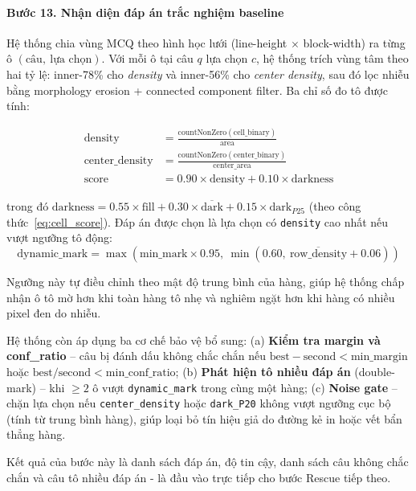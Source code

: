 \paragraph{Bước 13. Nhận diện đáp án trắc nghiệm baseline}
\label{sec:pipeline-buoc-13}

Hệ thống chia vùng MCQ theo hình học lưới (line-height $\times$ block-width) ra từng ô $(\text{câu},\ \text{lựa chọn})$. Với mỗi ô tại câu $q$ lựa chọn $c$, hệ thống trích vùng tâm theo hai tỷ lệ: inner-78\% cho \textit{density} và inner-56\% cho \textit{center density}, sau đó lọc nhiễu bằng morphology erosion + connected component filter. Ba chỉ số đo tô được tính:

\begin{align}
\text{density} &= \frac{\text{countNonZero}(\text{cell\_binary})}{\text{area}} \\[4pt]
\text{center\_density} &= \frac{\text{countNonZero}(\text{center\_binary})}{\text{center\_area}} \\[4pt]
\text{score} &= 0.90 \times \text{density} + 0.10 \times \text{darkness}
\end{align}

trong đó $\text{darkness} = 0.55 \times \text{fill} + 0.30 \times \overline{\text{dark}} + 0.15 \times \text{dark}_{P25}$ (theo công thức~\ref{eq:cell_score}). Đáp án được chọn là lựa chọn có \texttt{density} cao nhất nếu vượt ngưỡng tô động:
$$\text{dynamic\_mark} = \max\!\left(\text{min\_mark} \times 0.95,\ \min(0.60,\ \overline{\text{row\_density}} + 0.06)\right)$$

Ngưỡng này tự điều chỉnh theo mật độ trung bình của hàng, giúp hệ thống chấp nhận ô tô mờ hơn khi toàn hàng tô nhẹ và nghiêm ngặt hơn khi hàng có nhiều pixel đen do nhiễu.

Hệ thống còn áp dụng ba cơ chế bảo vệ bổ sung: (a) \textbf{Kiểm tra margin và conf\_ratio} -- câu bị đánh dấu không chắc chắn nếu $\text{best} - \text{second} < \text{min\_margin}$ hoặc $\text{best} / \text{second} < \text{min\_conf\_ratio}$; (b) \textbf{Phát hiện tô nhiều đáp án} (double-mark) -- khi $\geq 2$ ô vượt \texttt{dynamic\_mark} trong cùng một hàng; (c) \textbf{Noise gate} -- chặn lựa chọn nếu \texttt{center\_density} hoặc \texttt{dark\_P20} không vượt ngưỡng cục bộ (tính từ trung bình hàng), giúp loại bỏ tín hiệu giả do đường kẻ in hoặc vết bẩn thẳng hàng.

Kết quả của bước này là danh sách đáp án, độ tin cậy, danh sách câu không chắc chắn và câu tô nhiều đáp án - là đầu vào trực tiếp cho bước Rescue tiếp theo.


